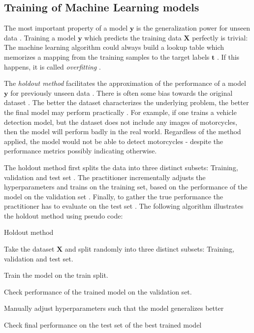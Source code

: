 \documentclass[draft,final,oneside]{vutinfth} %
\begin{document}
\subsection{Training of Machine Learning models} \label{trainingofml}

The most important property of a model $\boldsymbol{y}$ is the generalization power for unseen data \cite{bishop}. Training a model $\boldsymbol{y}$ which predicts the training data $\boldsymbol{X}$ perfectly is trivial: The machine learning algorithm could always build a lookup table which memorizes a mapping from the training samples to the target labels $\boldsymbol{t}$ \cite{overfitting}. If this happens, it is called \textit{overfitting} \cite{overfitting}.

The \textit{holdout method} facilitates the approximation of the performance of a model $\boldsymbol{y}$ for previously unseen data \cite{holdoutcrossvalidation}. There is often some bias towards the original dataset \cite{datasetbias}. The better the dataset characterizes the underlying problem, the better the final model may perform practically \cite{datasetshift}. For example, if one trains a vehicle detection model, but the dataset does not include any images of motorcycles, then the model will perform badly in the real world. Regardless of the method applied, the model would not be able to detect motorcycles - despite the performance metrics possibly indicating otherwise.

The holdout method first splits the data into three distinct subsets: Training, validation and test set \cite{holdoutcrossvalidation}. The practitioner incrementally adjusts the hyperparameters and trains on the training set, based on the performance of the model on the validation set \cite{holdoutcrossvalidation}. Finally, to gather the true performance the practitioner has to evaluate on the test set \cite{holdoutcrossvalidation}. The following algorithm illustrates the holdout method using pseudo code:

\begin{algorithm}
\caption{Holdout method \cite{holdoutcrossvalidation}}\label{holdoutalgo}
Take the dataset $\boldsymbol{X}$ and split randomly into three distinct subsets: Training, validation and test set.

 {
Train the model on the train split.

Check performance of the trained model on the validation set.

Manually adjust hyperparameters such that the model generalizes better
}

Check final performance on the test set of the best trained model

\end{algorithm}
\end{document}
